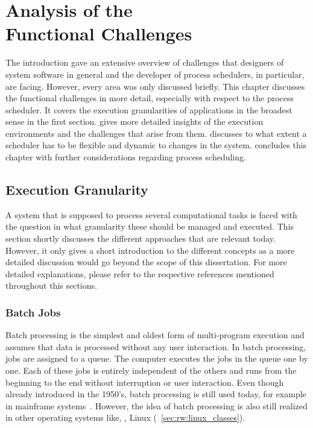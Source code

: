 \chapter[Analysis of the Functional Challenges]{Analysis of the \\ Functional Challenges}%
\label{chap:analysis}

The introduction gave an extensive overview of challenges that designers of system software in general and the developer of process schedulers, in particular, are facing. However, every area was only discussed briefly. This chapter discusses the functional challenges in more detail, especially with respect to the process scheduler. It covers the execution granularities of applications in the broadest sense in the first section.  gives more detailed insights of the execution environments and the challenges that arise from them.  discusses to what extent a scheduler has to be flexible and dynamic to changes in the system.  concludes this chapter with further considerations regarding process scheduling.

\section{Execution Granularity}%
\label{sec:analysis:exec}

A system that is supposed to process several computational tasks is faced with the question in what granularity these should be managed and executed. This section shortly discusses the different approaches that are relevant today. However, it only gives a short introduction to the different concepts as a more detailed discussion would go beyond the scope of this dissertation. For more detailed explanations, please refer to the respective references mentioned throughout this sections.

\subsection{Batch Jobs}%
\label{sec:analysis:exec:batch}

Batch processing is the simplest and oldest form of multi-program execution and assumes that data is processed without any user interaction. In batch processing, jobs are assigned to a queue. The computer executes the jobs in the queue one by one. Each of these jobs is entirely independent of the others and runs from the beginning to the end without interruption or user interaction. Even though already introduced in the 1950's, batch processing is still used today, for example in mainframe systems~\cite[273--290]{IBM-2011-Mainframe}.
However, the idea of batch processing is also still realized in other operating systems like, \eg, Linux (\cf~\cref{sec:rw:linux_classes}).


